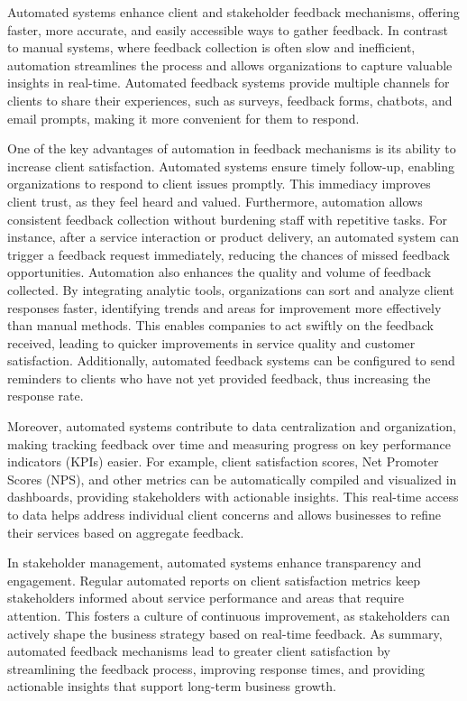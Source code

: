 Automated systems enhance client and stakeholder feedback mechanisms, offering faster, more accurate, and easily accessible ways to gather feedback. In contrast to manual systems, where feedback collection is often slow and inefficient, automation streamlines the process and allows organizations to capture valuable insights in real-time. Automated feedback systems provide multiple channels for clients to share their experiences, such as surveys, feedback forms, chatbots, and email prompts, making it more convenient for them to respond.

One of the key advantages of automation in feedback mechanisms is its ability to increase client satisfaction. Automated systems ensure timely follow-up, enabling organizations to respond to client issues promptly. This immediacy improves client trust, as they feel heard and valued. Furthermore, automation allows consistent feedback collection without burdening staff with repetitive tasks. For instance, after a service interaction or product delivery, an automated system can trigger a feedback request immediately, reducing the chances of missed feedback opportunities.
Automation also enhances the quality and volume of feedback collected. By integrating analytic tools, organizations can sort and analyze client responses faster, identifying trends and areas for improvement more effectively than manual methods. This enables companies to act swiftly on the feedback received, leading to quicker improvements in service quality and customer satisfaction. Additionally, automated feedback systems can be configured to send reminders to clients who have not yet provided feedback, thus increasing the response rate.

Moreover, automated systems contribute to data centralization and organization, making tracking feedback over time and measuring progress on key performance indicators (KPIs) easier. For example, client satisfaction scores, Net Promoter Scores (NPS), and other metrics can be automatically compiled and visualized in dashboards, providing stakeholders with actionable insights. This real-time access to data helps address individual client concerns and allows businesses to refine their services based on aggregate feedback.

In stakeholder management, automated systems enhance transparency and engagement. Regular automated reports on client satisfaction metrics keep stakeholders informed about service performance and areas that require attention. This fosters a culture of continuous improvement, as stakeholders can actively shape the business strategy based on real-time feedback. As summary, automated feedback mechanisms lead to greater client satisfaction by streamlining the feedback process, improving response times, and providing actionable insights that support long-term business growth.

